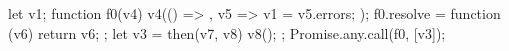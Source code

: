 let v1;
function f0(v4) {
    v4(() => { }, v5 => {
        v1 = v5.errors;
    });
}
f0.resolve = function (v6) { 
    return v6;
};
let v3 = {
    then(v7, v8) {v8();}
};
Promise.any.call(f0, [v3]);